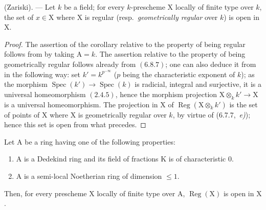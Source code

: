 \begin{corollary}[6.12.5]
\label{IV.6.12.5}
\textnormal{(Zariski).} --- Let $k$ be a field; for every $k$-prescheme $\mathrm{X}$ locally
of finite type over $k$, the set of $x\in\mathrm{X}$ where $\mathrm{X}$ is regular \textup{(resp.}\ \emph{geometrically regular} over $k$\textup{)}
is open in $\mathrm{X}$.
\end{corollary}

\begin{proof}
The assertion of the corollary relative to the property of being regular follows from
 by taking $\mathrm{A}=k$. The assertion relative to the property of being geometrically
regular follows already from $(6.8.7)$; one can also deduce it from  in the following
way: set $k'=k^{p^{-\infty}}$ ($p$ being the characteristic exponent of $k$); as the morphism
$\operatorname{Spec}(k')\to\operatorname{Spec}(k)$ is radicial, integral and surjective, it is a universal homeomorphism
$(2.4.5)$, hence the morphism projection $\mathrm{X}\otimes_k k'\to\mathrm{X}$ is a universal homeomorphism.
The projection in $\mathrm{X}$ of $\operatorname{Reg}(\mathrm{X}\otimes_k k')$ is the set of points of $\mathrm{X}$ where $\mathrm{X}$ is geometrically
regular over $k$, by virtue of (6.7.7,~\emph{e)}); hence this set is open from what
precedes.
\end{proof}

\begin{corollary}[6.12.6]
\label{IV.6.12.6}
Let $\mathrm{A}$ be a ring having one of the following properties:
\begin{enumerate}[label=\textup{(\roman*)}]
  \item $\mathrm{A}$ is a Dedekind ring and its field of fractions $\mathrm{K}$ is of characteristic $0$.
  \item $\mathrm{A}$ is a semi-local Noetherian ring of dimension $\leqslant 1$.
\end{enumerate}
Then, for every prescheme $\mathrm{X}$ locally of finite type over $\mathrm{A}$, $\operatorname{Reg}(\mathrm{X})$ is open in $\mathrm{X}$.
\end{corollary}

